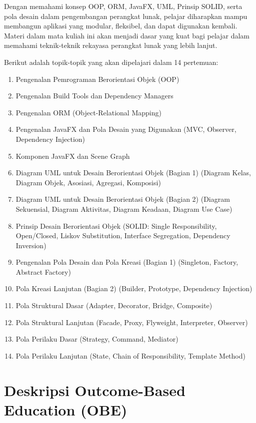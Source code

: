Dengan memahami konsep OOP, ORM, JavaFX, UML, Prinsip SOLID, serta pola desain dalam pengembangan perangkat lunak, pelajar diharapkan mampu membangun aplikasi yang modular, fleksibel, dan dapat digunakan kembali. Materi dalam mata kuliah ini akan menjadi dasar yang kuat bagi pelajar dalam memahami teknik-teknik rekayasa perangkat lunak yang lebih lanjut. 

Berikut adalah topik-topik yang akan dipelajari dalam 14 pertemuan:

\begin{enumerate}
	\item Pengenalan Pemrograman Berorientasi Objek (OOP)
	\item Pengenalan Build Tools dan Dependency Managers
	\item Pengenalan ORM (Object-Relational Mapping)
	\item Pengenalan JavaFX dan Pola Desain yang Digunakan (MVC, Observer, Dependency Injection)
	\item Komponen JavaFX dan Scene Graph
	\item Diagram UML untuk Desain Berorientasi Objek (Bagian 1) (Diagram Kelas, Diagram Objek, Asosiasi, Agregasi, Komposisi)
	\item Diagram UML untuk Desain Berorientasi Objek (Bagian 2) (Diagram Sekuensial, Diagram Aktivitas, Diagram Keadaan, Diagram Use Case)
	\item Prinsip Desain Berorientasi Objek (SOLID: Single Responsibility, Open/Closed, Liskov Substitution, Interface Segregation, Dependency Inversion)
	\item Pengenalan Pola Desain dan Pola Kreasi (Bagian 1) (Singleton, Factory, Abstract Factory)
	\item Pola Kreasi Lanjutan (Bagian 2) (Builder, Prototype, Dependency Injection)
	\item Pola Struktural Dasar (Adapter, Decorator, Bridge, Composite)
	\item Pola Struktural Lanjutan (Facade, Proxy, Flyweight, Interpreter, Observer)
	\item Pola Perilaku Dasar (Strategy, Command, Mediator)
	\item Pola Perilaku Lanjutan (State, Chain of Responsibility, Template Method)
\end{enumerate}



\section{Deskripsi Outcome-Based Education (OBE)}

